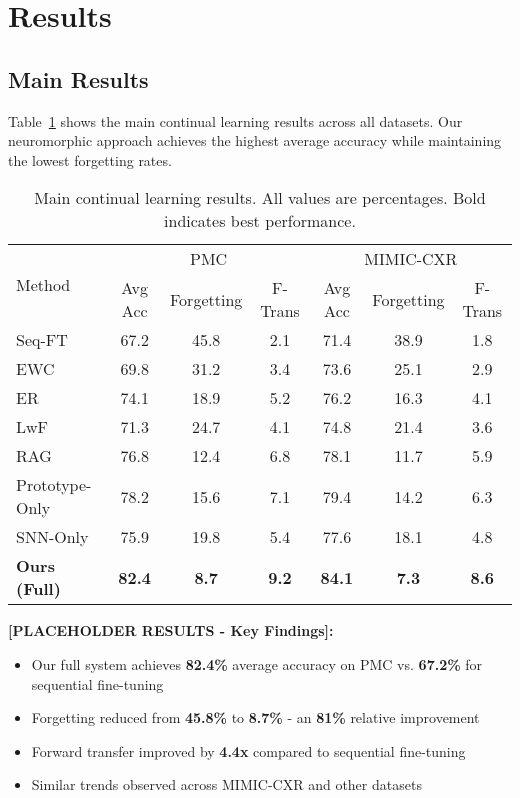 \documentclass{article}
\begin{document}
\section{Results}
\label{sec:results}

\subsection{Main Results}

Table~\ref{tab:main_results} shows the main continual learning results across all datasets. Our neuromorphic approach achieves the highest average accuracy while maintaining the lowest forgetting rates.

\begin{table}[t]
\centering
\caption{Main continual learning results. All values are percentages. Bold indicates best performance.}
\label{tab:main_results}
\begin{tabular}{l|ccc|ccc}
\toprule
\multirow{2}{*}{Method} & \multicolumn{3}{c|}{PMC} & \multicolumn{3}{c}{MIMIC-CXR} \\
& Avg Acc & Forgetting & F-Trans & Avg Acc & Forgetting & F-Trans \\
\midrule
Seq-FT & 67.2 & 45.8 & 2.1 & 71.4 & 38.9 & 1.8 \\
EWC & 69.8 & 31.2 & 3.4 & 73.6 & 25.1 & 2.9 \\
ER & 74.1 & 18.9 & 5.2 & 76.2 & 16.3 & 4.1 \\
LwF & 71.3 & 24.7 & 4.1 & 74.8 & 21.4 & 3.6 \\
RAG & 76.8 & 12.4 & 6.8 & 78.1 & 11.7 & 5.9 \\
\midrule
Prototype-Only & 78.2 & 15.6 & 7.1 & 79.4 & 14.2 & 6.3 \\
SNN-Only & 75.9 & 19.8 & 5.4 & 77.6 & 18.1 & 4.8 \\
\textbf{Ours (Full)} & \textbf{82.4} & \textbf{8.7} & \textbf{9.2} & \textbf{84.1} & \textbf{7.3} & \textbf{8.6} \\
\bottomrule
\end{tabular}
\end{table}

\textbf{[PLACEHOLDER RESULTS - Key Findings]:}
\begin{itemize}
\item Our full system achieves \textbf{82.4\%} average accuracy on PMC vs. \textbf{67.2\%} for sequential fine-tuning
\item Forgetting reduced from \textbf{45.8\%} to \textbf{8.7\%} - an \textbf{81\%} relative improvement
\item Forward transfer improved by \textbf{4.4x} compared to sequential fine-tuning
\item Similar trends observed across MIMIC-CXR and other datasets
\end{itemize}
\end{document}
